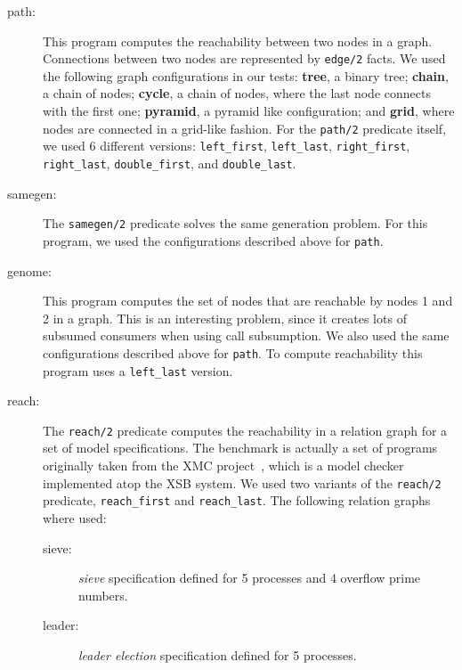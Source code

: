 \begin{description}
   
   \item[path:] This program computes the reachability between two nodes in a graph.
   Connections between two nodes are represented by \texttt{edge/2} facts.
   We used the following graph configurations in our tests: \textbf{tree}, a
   binary tree; \textbf{chain}, a chain of nodes; \textbf{cycle}, a chain of nodes, where the
   last node connects with the first one; \textbf{pyramid}, a pyramid like configuration;
   and \textbf{grid}, where nodes are connected in a grid-like fashion.
   For the \texttt{path/2} predicate itself, we used 6 different versions: \texttt{left\_first},
   \texttt{left\_last}, \texttt{right\_first}, \texttt{right\_last},
   \texttt{double\_first}, and \texttt{double\_last}.
    
   \item[samegen:] The \texttt{samegen/2} predicate solves the same generation problem.
   For this program, we used the configurations described above for \texttt{path}.
   
   \item[genome:] This program computes the set of nodes that are reachable by nodes 1 and 2 in a graph.
   This is an interesting problem, since it creates lots of subsumed consumers when using
   call subsumption. We also used the same configurations described above for \texttt{path}.
   To compute reachability this program uses a \texttt{left\_last} version.
   
   \item[reach:] The \texttt{reach/2} predicate computes the reachability in a relation graph for a set of
   model specifications. The benchmark is actually a set of programs originally taken from the
   XMC project~\cite{RamakrishnanCR-00}, which is a model checker implemented
   atop the XSB system. We used two variants of the \texttt{reach/2} predicate,
   \texttt{reach\_first} and \texttt{reach\_last}.
   The following relation graphs where used:
   
      \begin{description}
         
         \item[sieve:] \emph{sieve} specification defined for 5 processes and 4 overflow prime numbers.
         
         \item[leader:] \emph{leader election} specification defined for 5 processes.
         

\end{description}
\end{description}
